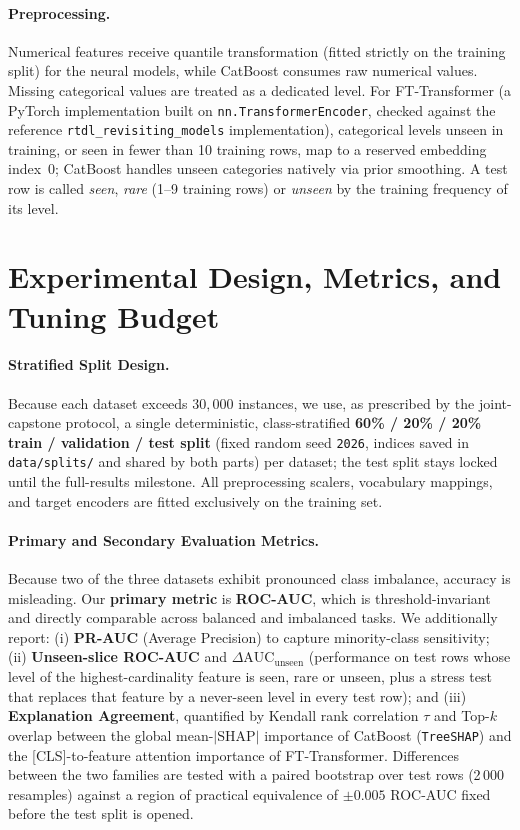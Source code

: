 \documentclass[twoside,11pt]{article}
\begin{document}
\paragraph{Preprocessing.} Numerical features receive quantile transformation (fitted strictly on the training split) for the neural models, while CatBoost consumes raw numerical values. Missing categorical values are treated as a dedicated level. For FT-Transformer (a PyTorch implementation built on \texttt{nn.TransformerEncoder}, checked against the reference \texttt{rtdl\_revisiting\_models} implementation), categorical levels unseen in training, or seen in fewer than 10 training rows, map to a reserved embedding index~0; CatBoost handles unseen categories natively via prior smoothing. A test row is called \emph{seen}, \emph{rare} (1--9 training rows) or \emph{unseen} by the training frequency of its level.

\section{Experimental Design, Metrics, and Tuning Budget}
\paragraph{Stratified Split Design.} Because each dataset exceeds $30{,}000$ instances, we use, as prescribed by the joint-capstone protocol, a single deterministic, class-stratified \textbf{60\% / 20\% / 20\% train / validation / test split} (fixed random seed \texttt{2026}, indices saved in \texttt{data/splits/} and shared by both parts) per dataset; the test split stays locked until the full-results milestone. All preprocessing scalers, vocabulary mappings, and target encoders are fitted exclusively on the training set.

\paragraph{Primary and Secondary Evaluation Metrics.}
Because two of the three datasets exhibit pronounced class imbalance, accuracy is misleading. Our \textbf{primary metric} is \textbf{ROC-AUC}, which is threshold-invariant and directly comparable across balanced and imbalanced tasks. We additionally report: (i) \textbf{PR-AUC} (Average Precision) to capture minority-class sensitivity; (ii) \textbf{Unseen-slice ROC-AUC} and $\Delta\text{AUC}_{\text{unseen}}$ (performance on test rows whose level of the highest-cardinality feature is seen, rare or unseen, plus a stress test that replaces that feature by a never-seen level in every test row); and (iii) \textbf{Explanation Agreement}, quantified by Kendall rank correlation $\tau$ and Top-$k$ overlap between the global mean-$|$SHAP$|$ importance of CatBoost (\texttt{TreeSHAP}) and the [CLS]-to-feature attention importance of FT-Transformer. Differences between the two families are tested with a paired bootstrap over test rows (2\,000 resamples) against a region of practical equivalence of $\pm 0.005$ ROC-AUC fixed before the test split is opened.
\end{document}
